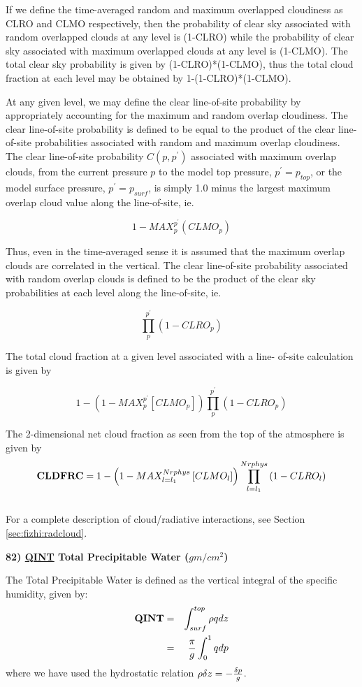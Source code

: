 If we define the
time-averaged random and maximum overlapped cloudiness as CLRO and
CLMO respectively, then the probability of clear sky associated 
with random overlapped clouds at any level is (1-CLRO) while the probability of
clear sky associated with maximum overlapped clouds at any level is (1-CLMO). 
The total clear sky probability is given by (1-CLRO)*(1-CLMO), thus
the total cloud fraction at each  level may be obtained by 
1-(1-CLRO)*(1-CLMO).

At any given level, we may define the clear line-of-site probability by
appropriately accounting for the maximum and random overlap
cloudiness.  The clear line-of-site probability is defined to be
equal to the product of the clear line-of-site probabilities
associated with random and maximum overlap cloudiness.  The clear
line-of-site probability $C(p,p^{\prime})$ associated with maximum overlap clouds, 
from the current pressure $p$ 
to the model top pressure, $p^{\prime} = p_{top}$, or the model surface pressure, $p^{\prime} = p_{surf}$,
is simply 1.0 minus the largest maximum overlap cloud value along  the
line-of-site, ie.

$$1-MAX_p^{p^{\prime}} \left( CLMO_p \right)$$

Thus, even in the time-averaged sense it is assumed that the
maximum overlap clouds are correlated in the vertical.  The clear
line-of-site probability associated with random overlap clouds is
defined to be the product of the clear sky probabilities at each
level along the line-of-site, ie. 

$$\prod_{p}^{p^{\prime}} \left( 1-CLRO_p \right)$$

The total cloud fraction at a given level associated with a line-
of-site calculation is given by

$$1-\left( 1-MAX_p^{p^{\prime}} \left[ CLMO_p \right] \right)
    \prod_p^{p^{\prime}} \left( 1-CLRO_p \right)$$


\noindent
The 2-dimensional net cloud fraction as seen from the top of the
atmosphere is given by
\[
{\bf CLDFRC} = 1-\left( 1-MAX_{l=l_1}^{Nrphys} \left[ CLMO_l \right] \right)
    \prod_{l=l_1}^{Nrphys} \left( 1-CLRO_l \right)
\]
\\
For a complete description of cloud/radiative interactions, see Section \ref{sec:fizhi:radcloud}.


\noindent
{\bf 82)  \underline {QINT} Total Precipitable Water ($gm/cm^2$) }

\noindent
The Total Precipitable Water is defined as the vertical integral of the specific humidity,
given by:
\begin{eqnarray*}
{\bf QINT} & = & \int_{surf}^{top} \rho q dz \\
           & = & {\pi \over g} \int_0^1 q dp
\end{eqnarray*}
where we have used the hydrostatic relation 
$\rho \delta z = -{\delta p \over g} $.
\\


